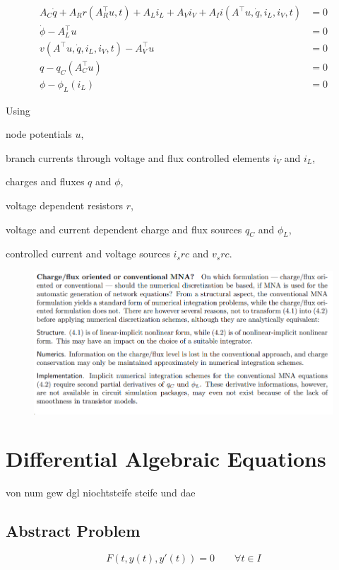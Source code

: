 \documentclass[11pt,titlepage]{article}
\begin{document}
			\begin{align}
				A_C\dot{q} + A_R r(A_R^\top u,t) + A_L i_L + A_V i_V + A_I i(A^\top u, \dot{q}, i_L, i_V, t) &= 0 \label{charge/flux-1} \\
				\dot{\phi} - A_L^\top u &= 0 \label{charge/flux-2} \\
				v(A^\top u, \dot{q}, i_L, i_V, t) - A_V^\top u &= 0 \label{charge/flux-3} \\
				q - q_C(A_C^\top u) &= 0 \label{charge/flux-4} \\
				\phi - \phi_L(i_L) &= 0  \label{charge/flux-5} 
			\end{align}
			
			Using
			\begin{description}
				\item node potentials $u$,
				\item branch currents through voltage and flux controlled elements $i_V$ and $i_L$,
				\item charges and fluxes $q$ and $\phi$,
				\item voltage dependent resistors $r$,
				\item voltage and current dependent charge and flux sources $q_C$ and $\phi_L$,
				\item controlled current and voltage sources $i_src$ and $v_src$.
			\end{description} 
			
			\begin{figure}[H]
				\centering
				\includegraphics[width=0.7\linewidth]{screenshot007}
				\caption{}
				\label{fig:screenshot007}
			\end{figure}
			
		
	\newpage	
	\section{Differential Algebraic Equations}
	
		von num gew dgl niochtsteife steife und dae
	
		\subsection{Abstract Problem}
			\begin{equation}
				\label{Abstract_DAE}
				F(t, y(t), y'(t)) = 0 \qquad \forall t \in I
			\end{equation}
			
\end{document}
